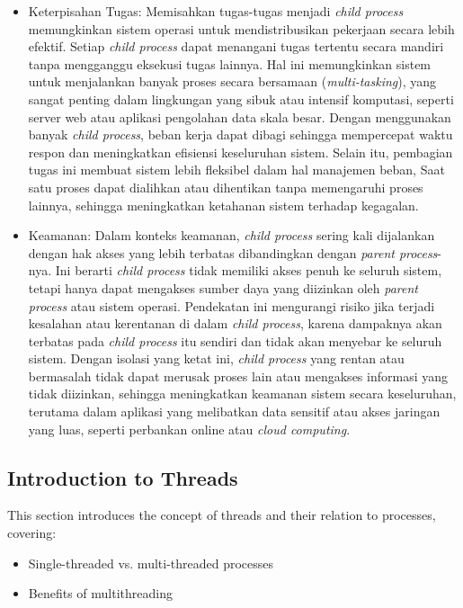 \documentclass[12pt]{article}
\begin{document}
\begin{itemize}
    \item {Keterpisahan Tugas:} Memisahkan tugas-tugas menjadi \textit{child process} memungkinkan sistem operasi untuk mendistribusikan pekerjaan secara lebih efektif. Setiap \textit{child process} dapat menangani tugas tertentu secara mandiri tanpa mengganggu eksekusi tugas lainnya. Hal ini memungkinkan sistem untuk menjalankan banyak proses secara bersamaan (\textit{multi-tasking}), yang sangat penting dalam lingkungan yang sibuk atau intensif komputasi, seperti server web atau aplikasi pengolahan data skala besar. Dengan menggunakan banyak \textit{child process}, beban kerja dapat dibagi sehingga mempercepat waktu respon dan meningkatkan efisiensi keseluruhan sistem. Selain itu, pembagian tugas ini membuat sistem lebih fleksibel dalam hal manajemen beban, Saat satu proses dapat dialihkan atau dihentikan tanpa memengaruhi proses lainnya, sehingga meningkatkan ketahanan sistem terhadap kegagalan.

    \item {Keamanan:} Dalam konteks keamanan, \textit{child process} sering kali dijalankan dengan hak akses yang lebih terbatas dibandingkan dengan \textit{parent process}-nya. Ini berarti \textit{child process} tidak memiliki akses penuh ke seluruh sistem, tetapi hanya dapat mengakses sumber daya yang diizinkan oleh \textit{parent process} atau sistem operasi. Pendekatan ini mengurangi risiko jika terjadi kesalahan atau kerentanan di dalam \textit{child process}, karena dampaknya akan terbatas pada \textit{child process} itu sendiri dan tidak akan menyebar ke seluruh sistem. Dengan isolasi yang ketat ini, \textit{child process} yang rentan atau bermasalah tidak dapat merusak proses lain atau mengakses informasi yang tidak diizinkan, sehingga meningkatkan keamanan sistem secara keseluruhan, terutama dalam aplikasi yang melibatkan data sensitif atau akses jaringan yang luas, seperti perbankan online atau \textit{cloud computing}.
\end{itemize}

\subsection{Introduction to Threads}
This section introduces the concept of threads and their relation to processes, covering:
\begin{itemize}
    \item Single-threaded vs. multi-threaded processes
    \item Benefits of multithreading
\end{itemize}
\end{document}
